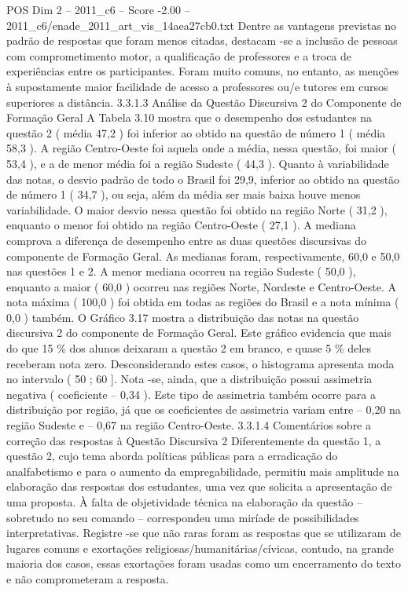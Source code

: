 \begin{textsample}{POS Dim 2 – 2011\_c6 – Score -2.00 – 2011\_c6/enade\_2011\_art\_vis\_14aea27cb0.txt}
Dentre as vantagens previstas no padrão de respostas que foram menos citadas, destacam -se a inclusão de pessoas com comprometimento motor, a qualificação de professores e a troca de experiências entre os participantes.
Foram muito comuns, no entanto, as menções à supostamente maior facilidade de acesso a professores ou/e tutores em cursos superiores a distância. 3.3.1.3 Análise da Questão Discursiva 2 do Componente de Formação Geral A Tabela 3.10 mostra que o desempenho dos estudantes na questão 2 ( média 47,2 ) foi inferior ao obtido na questão de número 1 ( média 58,3 ).
A região Centro-Oeste foi aquela onde a média, nessa questão, foi maior ( 53,4 ), e a de menor média foi a região Sudeste ( 44,3 ).
Quanto à variabilidade das notas, o desvio padrão de todo o Brasil foi 29,9, inferior ao obtido na questão de número 1 ( 34,7 ), ou seja, além da média ser mais baixa houve menos variabilidade.
O maior desvio nessa questão foi obtido na região Norte ( 31,2 ), enquanto o menor foi obtido na região Centro-Oeste ( 27,1 ).
A mediana comprova a diferença de desempenho entre as duas questões discursivas do componente de Formação Geral.
As medianas foram, respectivamente, 60,0 e 50,0 nas questões 1 e 2.
A menor mediana ocorreu na região Sudeste ( 50,0 ), enquanto a maior ( 60,0 ) ocorreu nas regiões Norte, Nordeste e Centro-Oeste.
A nota máxima ( 100,0 ) foi obtida em todas as regiões do Brasil e a nota mínima ( 0,0 ) também.
O Gráfico 3.17 mostra a distribuição das notas na questão discursiva 2 do componente de Formação Geral.
Este gráfico evidencia que mais do que 15 \% dos alunos deixaram a questão 2 em branco, e quase 5 \% deles receberam nota zero.
Desconsiderando estes casos, o histograma apresenta moda no intervalo ( 50 ; 60 ].
Nota -se, ainda, que a distribuição possui assimetria negativa ( coeficiente – 0,34 ).
Este tipo de assimetria também ocorre para a distribuição por região, já que os coeficientes de assimetria variam entre – 0,20 na região Sudeste e – 0,67 na região Centro-Oeste. 3.3.1.4 Comentários sobre a correção das respostas à Questão Discursiva 2 Diferentemente da questão 1, a questão 2, cujo tema aborda políticas públicas para a erradicação do analfabetismo e para o aumento da empregabilidade, permitiu mais amplitude na elaboração das respostas dos estudantes, uma vez que solicita a apresentação de uma proposta.
À falta de objetividade técnica na elaboração da questão – sobretudo no seu comando – correspondeu uma miríade de possibilidades interpretativas.
Registre -se que não raras foram as respostas que se utilizaram de lugares comuns e exortações religiosas/humanitárias/cívicas, contudo, na grande maioria dos casos, essas exortações foram usadas como um encerramento do texto e não comprometeram a resposta.

\end{textsample}
